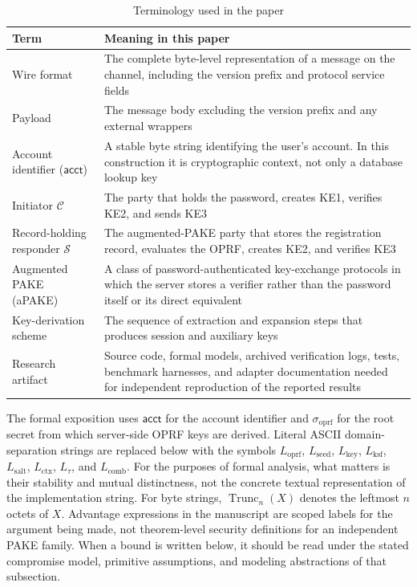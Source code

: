 \documentclass{ieeeijc}
\newcommand{\acct}{\mathsf{acct}}
\newcommand{\sigoprf}{\sigma_{\mathrm{oprf}}}
\newcommand{\Label}[1]{L_{\mathrm{#1}}}
\theoremstyle{remark}
\begin{document}
\begin{table}[t]
\caption{Terminology used in the paper}
\label{tab:terminology}
\centering\small
\begin{tabularx}{\textwidth}{@{}L{3.2cm}X@{}}
\toprule
Term & Meaning in this paper \\
\midrule
Wire format & The complete byte-level representation of a message on the channel, including the version prefix and protocol service fields \\
Payload & The message body excluding the version prefix and any external wrappers \\
Account identifier ($\acct$) & A stable byte string identifying the user's account. In this construction it is cryptographic context, not only a database lookup key \\
Initiator $\mathcal{C}$ & The party that holds the password, creates KE1, verifies KE2, and sends KE3 \\
Record-holding responder $\mathcal{S}$ & The augmented-PAKE party that stores the registration record, evaluates the OPRF, creates KE2, and verifies KE3 \\
Augmented PAKE (aPAKE) & A class of password-authenticated key-exchange protocols in which the server stores a verifier rather than the password itself or its direct equivalent \\
Key-derivation scheme & The sequence of extraction and expansion steps that produces session and auxiliary keys \\
Research artifact & Source code, formal models, archived verification logs, tests, benchmark harnesses, and adapter documentation needed for independent reproduction of the reported results \\
\bottomrule
\end{tabularx}
\end{table}

The formal exposition uses $\acct$ for the account identifier and $\sigoprf$ for the root secret from which server-side OPRF keys are derived. Literal ASCII domain-separation strings are replaced below with the symbols $\Label{oprf}$, $\Label{seed}$, $\Label{key}$, $\Label{ksf}$, $\Label{salt}$, $\Label{ctx}$, $L_{\tau}$, and $\Label{comb}$. For the purposes of formal analysis, what matters is their stability and mutual distinctness, not the concrete textual representation of the implementation string. For byte strings, $\operatorname{Trunc}_n(X)$ denotes the leftmost $n$ octets of $X$. Advantage expressions in the manuscript are scoped labels for the argument being made, not theorem-level security definitions for an independent PAKE family. When a bound is written below, it should be read under the stated compromise model, primitive assumptions, and modeling abstractions of that subsection.
\end{document}
